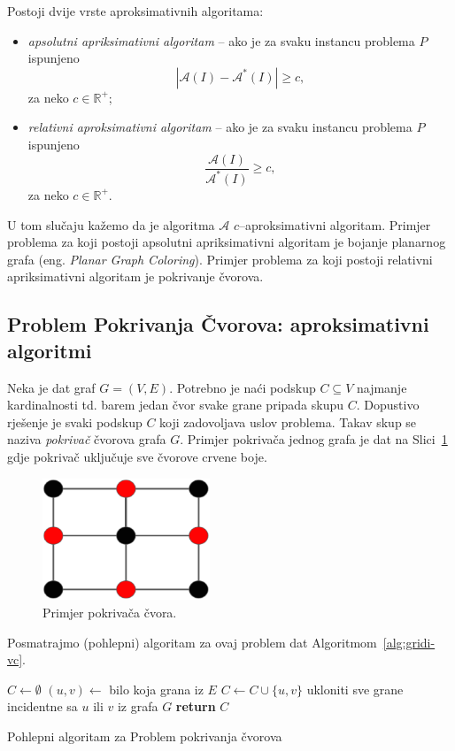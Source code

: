 \documentclass[a4paper, utf8, 11pt, colorlinks]{book}
\begin{document}
  Postoji dvije vrste aproksimativnih algoritama:
  \begin{itemize}
  	\item \emph{apsolutni apriksimativni algoritam} -- ako je za svaku instancu problema $P$ ispunjeno
  	$$ |\mathcal{A}(I) - \mathcal{A}^*(I)| \geq c,$$ za neko $c\in \mathbb{R}^+$;
  	\item \emph{relativni aproksimativni algoritam} -- ako je   za svaku instancu problema $P$ ispunjeno
  	$$\frac{\mathcal{A}(I)}{\mathcal{A}^*(I)} \geq c,$$ za neko $c\in \mathbb{R}^+$.
  \end{itemize}
  
  \noindent U tom slučaju kažemo da je algoritma $\mathcal{A}$ $c$--aproksimativni algoritam.
  Primjer problema za koji postoji apsolutni apriksimativni algoritam je bojanje planarnog grafa (eng. \emph{Planar Graph Coloring}). Primjer problema za koji postoji relativni apriksimativni algoritam je pokrivanje čvorova. 
  
  \subsection{Problem Pokrivanja Čvorova: aproksimativni algoritmi}
  
  Neka je dat graf $G=(V,E)$. Potrebno je naći podskup $C\subseteq V$ najmanje kardinalnosti td. barem jedan čvor svake grane pripada skupu $C$.  Dopustivo rješenje je svaki podskup $C$ koji zadovoljava uslov problema. Takav skup se naziva \emph{pokrivač} čvorova grafa $G$. Primjer pokrivača jednog grafa je dat na Slici~\ref{vertex-cover} gdje pokrivač uključuje sve čvorove crvene boje. 
  
  \begin{figure}
  	\centering
  	\includegraphics[width=50mm]{vertex-cover.eps}
  	\caption{Primjer pokrivača čvora.} 
  	\label{vertex-cover}
  \end{figure}
  
  Posmatrajmo (pohlepni) algoritam za ovaj problem dat Algoritmom~\ref{alg:gridi-vc}. 
  
  \begin{algorithm}[H] 
  	\begin{algorithmic}[1]
  		\STATE $C \gets \emptyset$
  		\STATE $(u,v) \gets$ bilo koja grana iz $E$
  		\STATE $C \gets C \cup \{u,v\}$
  		\STATE ukloniti sve grane incidentne sa  $u$ ili $v$ iz grafa $G$
  		\ENDWHILE
  		\STATE \textbf{return} $C$
  	\end{algorithmic}   
   
     \caption{Pohlepni algoritam za Problem pokrivanja čvorova}
 \label{alg:gridi-vc}
  \end{algorithm}
  
\end{document}
